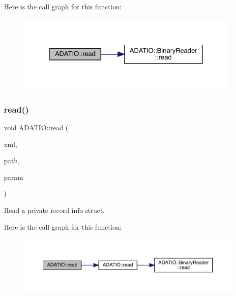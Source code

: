 Here is the call graph for this function\+:\nopagebreak
\begin{figure}[H]
\begin{center}
\leavevmode
\includegraphics[width=313pt]{d0/dba/namespaceADATIO_a02ebdefcf436220fd6967af8391de2d6_cgraph}
\end{center}
\end{figure}
\mbox{\label{namespaceADATIO_ac5827e268402afb3a0bb4ebbcec97706}} 
\subsubsection{\texorpdfstring{read()}{read()}\hspace{0.1cm}{\footnotesize\ttfamily [10/28]}}
{\footnotesize\ttfamily void A\+D\+A\+T\+I\+O\+::read (\begin{DoxyParamCaption}\item[{\mbox{\hyperlink{classADATXML_1_1XMLReader}{X\+M\+L\+Reader}} \&}]{xml,  }\item[{const std\+::string \&}]{path,  }\item[{\mbox{\hyperlink{structADATIO_1_1QIORecordInfo__t}{Q\+I\+O\+Record\+Info\+\_\+t}} \&}]{param }\end{DoxyParamCaption})}



Read a private record info struct. 

Here is the call graph for this function\+:\nopagebreak
\begin{figure}[H]
\begin{center}
\leavevmode
\includegraphics[width=350pt]{d0/dba/namespaceADATIO_ac5827e268402afb3a0bb4ebbcec97706_cgraph}
\end{center}
\end{figure}
\mbox{\label{namespaceADATIO_a66f06451ef1705309458a4e2adc71a28}} 

